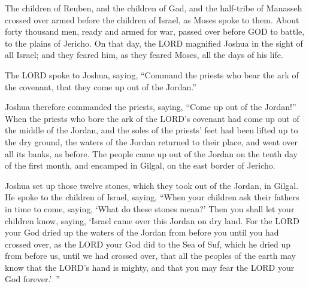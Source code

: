 \myverse{}The children of Reuben, and the children of Gad, and the half-tribe
of Manasseh crossed over armed before the children of Israel, as Moses spoke to them.
\myverse{}About forty thousand men, ready and armed for war, passed over before GOD
to battle, to the plains of Jericho.
\myverse{}On that day, the LORD magnified Joshua in the sight of all Israel; and they
feared him, as they feared Moses, all the days of his life.

\myverse{}The LORD spoke to Joshua, saying,
\myverse{}“Command the priests who bear the ark of the covenant, that they come up out
of the Jordan.”

\myverse{}Joshua therefore commanded the priests, saying, “Come up out
of the Jordan!”
\myverse{}When the priests who bore the ark of the LORD’s covenant had come up out of
the middle of the Jordan, and the soles of the priests’ feet had been lifted up to the dry ground, the
waters of the Jordan returned to their place, and went over all its banks, as before.
\myverse{}The people came up out of the Jordan on the tenth day of the first month,
and encamped in Gilgal, on the east border of Jericho.

\myverse{}Joshua set up those twelve stones, which they took out of the
Jordan, in Gilgal.
\myverse{}He spoke to the children of Israel, saying, “When your children ask their
fathers in time to come, saying, ‘What do these stones mean?’
\myverse{}Then you shall let your children know, saying, ‘Israel came over this Jordan
on dry land.
\myverse{}For the LORD your God dried up the waters of the Jordan from before you until
you had crossed over, as the LORD your God did to the Sea of Suf, which he dried up from before us, until
we had crossed over,
\myverse{}that all the peoples of the earth may know that the LORD’s hand is mighty,
and that you may fear the LORD your God forever.’ ”


